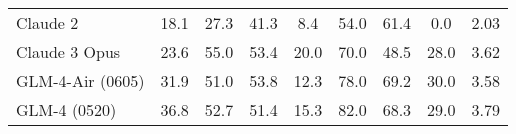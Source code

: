 \begin{table}[!ht]
{\begin{tabular}{@{}l|ccccccc|c@{}}
Claude 2               & 18.1                                                       & 27.3     & 41.3                                                      & 8.4                                                                & 54.0                                                    & 61.4                                                   & 0.0                                                    & 2.03    \\
Claude 3 Opus          & 23.6                                                       & 55.0     & 53.4                                                      & 20.0                                                               & 70.0                                                    & 48.5                                                   & 28.0                                                   & 3.62    \\ \midrule
GLM-4-Air (0605)              & 31.9                                                       & 51.0     & 53.8                                                      & 12.3                                                               & 78.0                                                    & 69.2                                                   & 30.0                                                   & 3.58    \\
GLM-4 (0520)           & 36.8                                                       & 52.7     & 51.4                                                      & 15.3                                                               & 82.0                                                    & 68.3                                                   & 29.0                                                   & 3.79    \\ \bottomrule
\end{tabular}
}
\label{tab:agent}
\end{table}